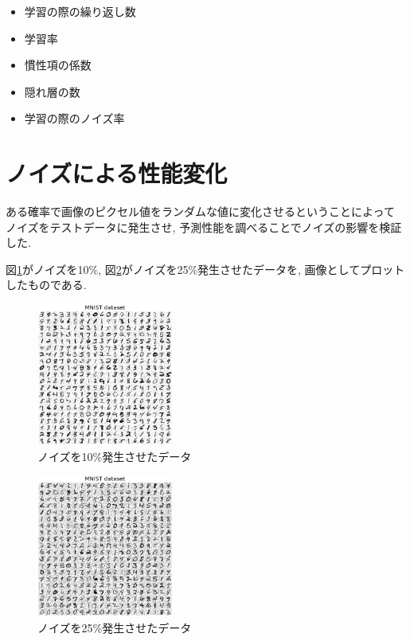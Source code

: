 \documentclass[10pt,a4paper,twocolumn]{jarticle}
\begin{document}
\begin{itemize}
  \item 学習の際の繰り返し数
  \item 学習率
  \item 慣性項の係数
  \item 隠れ層の数
  \item 学習の際のノイズ率
\end{itemize}


\section{ノイズによる性能変化}
ある確率で画像のピクセル値をランダムな値に変化させるということによって
ノイズをテストデータに発生させ,
予測性能を調べることでノイズの影響を検証した. 

図\ref{fig:noise-0.1}がノイズを10\%,
図\ref{fig:noise-0.25}がノイズを25\%発生させたデータを, 
画像としてプロットしたものである. 

\begin{figure}[htbp]
  \centering
  \includegraphics[width=0.4\textwidth]{assets/img/tiled_mnist_nl0.1.eps}
  \caption{ノイズを10\%発生させたデータ}
  \label{fig:noise-0.1}
\end{figure}
\begin{figure}[htbp]
  \centering
  \includegraphics[width=0.4\textwidth]{assets/img/tiled_mnist_nl0.25.eps}
  \caption{ノイズを25\%発生させたデータ}
  \label{fig:noise-0.25}
\end{figure}
\end{document}
